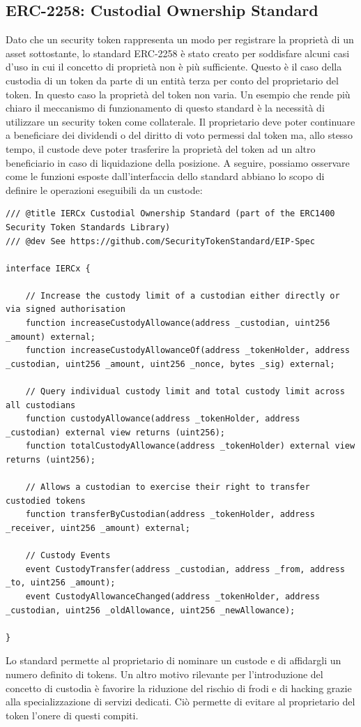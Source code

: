 \subsection{ERC-2258: Custodial Ownership Standard}
Dato che un security token rappresenta un modo per registrare la proprietà di un asset sottostante, lo standard ERC-2258 è stato creato per soddisfare alcuni casi d'uso in cui il concetto di proprietà non è più sufficiente. Questo è il caso della custodia di un token da parte di un entità terza per conto del proprietario del token. In questo caso la proprietà del token non varia. Un esempio che rende più chiaro il meccanismo di funzionamento di questo standard è la necessità di utilizzare un security token come collaterale. Il proprietario deve poter continuare a beneficiare dei dividendi o del diritto di voto permessi dal token ma, allo stesso tempo, il custode deve poter trasferire la proprietà del token ad un altro beneficiario in caso di liquidazione della posizione.   
A seguire, possiamo osservare come le funzioni esposte dall'interfaccia dello standard abbiano lo scopo di definire le operazioni eseguibili da un custode: 
\begin{lstlisting}[language=Solidity,numbers=none]
/// @title IERCx Custodial Ownership Standard (part of the ERC1400 Security Token Standards Library)
/// @dev See https://github.com/SecurityTokenStandard/EIP-Spec

interface IERCx {

    // Increase the custody limit of a custodian either directly or via signed authorisation
    function increaseCustodyAllowance(address _custodian, uint256 _amount) external;
    function increaseCustodyAllowanceOf(address _tokenHolder, address _custodian, uint256 _amount, uint256 _nonce, bytes _sig) external;

    // Query individual custody limit and total custody limit across all custodians
    function custodyAllowance(address _tokenHolder, address _custodian) external view returns (uint256);
    function totalCustodyAllowance(address _tokenHolder) external view returns (uint256);

    // Allows a custodian to exercise their right to transfer custodied tokens
    function transferByCustodian(address _tokenHolder, address _receiver, uint256 _amount) external;

    // Custody Events
    event CustodyTransfer(address _custodian, address _from, address _to, uint256 _amount);
    event CustodyAllowanceChanged(address _tokenHolder, address _custodian, uint256 _oldAllowance, uint256 _newAllowance);

}
\end{lstlisting}

Lo standard permette al proprietario di nominare un custode e di affidargli un numero definito di tokens. 
Un altro motivo rilevante per l'introduzione del concetto di custodia è favorire la riduzione del rischio di frodi e di hacking grazie alla specializzazione di servizi dedicati. Ciò permette di evitare al proprietario del token l'onere di questi compiti.
